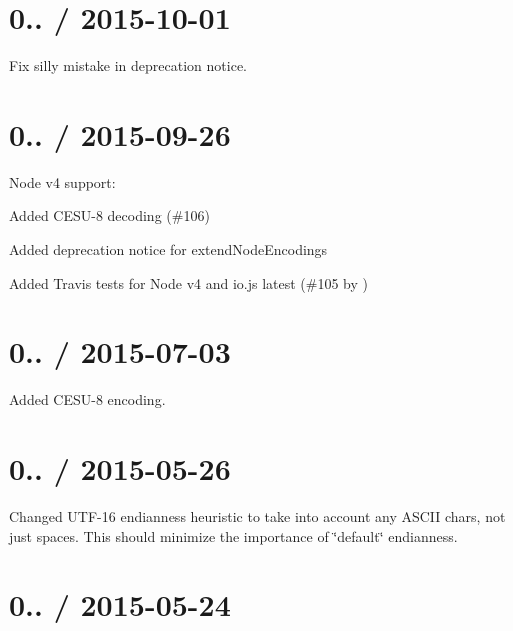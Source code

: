 \section*{0.. / 2015-\/10-\/01}


\begin{DoxyItemize}
\item Fix silly mistake in deprecation notice.
\end{DoxyItemize}

\section*{0.. / 2015-\/09-\/26}


\begin{DoxyItemize}
\item Node v4 support\+:
\begin{DoxyItemize}
\item Added C\+E\+S\+U-\/8 decoding (\#106)
\item Added deprecation notice for {\ttfamily extend\+Node\+Encodings}
\item Added Travis tests for Node v4 and io.\+js latest (\#105 by )
\end{DoxyItemize}
\end{DoxyItemize}

\section*{0.. / 2015-\/07-\/03}


\begin{DoxyItemize}
\item Added C\+E\+S\+U-\/8 encoding.
\end{DoxyItemize}

\section*{0.. / 2015-\/05-\/26}


\begin{DoxyItemize}
\item Changed U\+T\+F-\/16 endianness heuristic to take into account any A\+S\+C\+II chars, not just spaces. This should minimize the importance of \char`\"{}default\char`\"{} endianness.
\end{DoxyItemize}

\section*{0.. / 2015-\/05-\/24}


